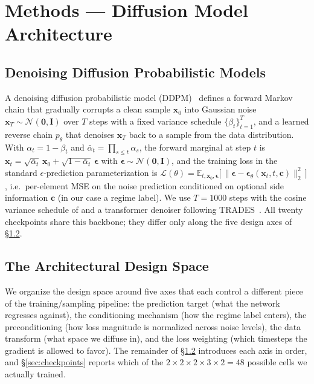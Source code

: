 \documentclass[journal]{IEEEtran}
\theoremstyle{definition}   %
\begin{document}
\section{Methods --- Diffusion Model Architecture}
\label{sec:methods}

\subsection{Denoising Diffusion Probabilistic Models}
\label{sec:ddpm}

A denoising diffusion probabilistic model (DDPM)~\cite{ho2020denoising}
defines a forward Markov chain that gradually corrupts a clean sample
$\mathbf{x}_0$ into Gaussian noise $\mathbf{x}_T \sim \mathcal{N}(\mathbf{0},
\mathbf{I})$ over $T$ steps with a fixed variance schedule
$\{\beta_t\}_{t=1}^{T}$, and a learned reverse chain $p_\theta$ that
denoises $\mathbf{x}_T$ back to a sample from the data distribution.
With $\alpha_t = 1 - \beta_t$ and $\bar\alpha_t = \prod_{s\le t}\alpha_s$,
the forward marginal at step $t$ is
$\mathbf{x}_t = \sqrt{\bar\alpha_t}\,\mathbf{x}_0 + \sqrt{1-\bar\alpha_t}\,\boldsymbol\epsilon$
with $\boldsymbol\epsilon\sim\mathcal{N}(\mathbf{0},\mathbf{I})$, and the
training loss in the standard $\epsilon$-prediction
parameterization is
$\mathcal{L}(\theta) = \mathbb{E}_{t, \mathbf{x}_0, \boldsymbol\epsilon}
\bigl[\,\lVert\boldsymbol\epsilon - \boldsymbol\epsilon_\theta(\mathbf{x}_t, t, \mathbf{c})\rVert_2^2\,\bigr]$,
i.e.\ per-element MSE on the noise prediction conditioned on optional
side information $\mathbf{c}$ (in our case a regime label). We use
$T=1000$ steps with the cosine variance schedule of
\cite{nichol2021improved} and a transformer denoiser following
TRADES~\cite{berti2025trades}. All twenty checkpoints share this
backbone; they differ only along the five design axes of
\S\ref{sec:design_space}.

\subsection{The Architectural Design Space}
\label{sec:design_space}

We organize the design space around five axes that each control a
different piece of the training/sampling pipeline: the prediction target
(what the network regresses against), the conditioning mechanism (how the
regime label enters), the preconditioning (how loss magnitude is
normalized across noise levels), the data transform (what space we
diffuse in), and the loss weighting (which timesteps the gradient is
allowed to favor). The remainder of \S\ref{sec:design_space} introduces
each axis in order, and \S\ref{sec:checkpoints} reports which of the
$2{\times}2{\times}2{\times}3{\times}2 = 48$ possible cells we actually
trained.
\end{document}
